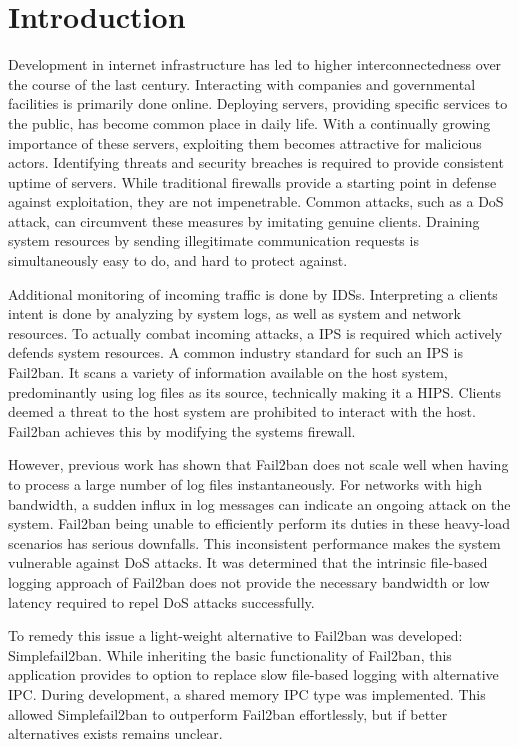 %
%

\chapter{Introduction}
\label{cha:introduction}
Development in internet infrastructure has led to higher interconnectedness over the course of the last century.
Interacting with companies and governmental facilities is primarily done online.
Deploying servers, providing specific services to the public, has become common place in daily life.
With a continually growing importance of these servers, exploiting them becomes attractive for malicious actors.
Identifying threats and security breaches is required to provide consistent uptime of servers.
While traditional firewalls provide a starting point in defense against exploitation, they are not impenetrable.
Common attacks, such as a \ac{DoS} attack, can circumvent these measures by imitating genuine clients.
Draining system resources by sending illegitimate communication requests is simultaneously easy to do, and hard to protect against.

Additional monitoring of incoming traffic is done by \ac{IDSs}.
Interpreting a clients intent is done by analyzing by system logs, as well as system and network resources.
To actually combat incoming attacks, a \ac{IPS} is required which actively defends system resources.
A common industry standard for such an \ac{IPS} is Fail2ban\cite{git:fail2ban}.
It scans a variety of information available on the host system, predominantly using log files as its source, technically making it a \ac{HIPS}.
Clients deemed a threat to the host system are prohibited to interact with the host.
Fail2ban achieves this by modifying the systems firewall.

However, previous work has shown that Fail2ban does not scale well when having to process a large number of log files instantaneously\cite{mikolajczak:ebpf}.
For networks with high bandwidth, a sudden influx in log messages can indicate an ongoing attack on the system.
Fail2ban being unable to efficiently perform its duties in these heavy-load scenarios has serious downfalls.
This inconsistent performance makes the system vulnerable against \ac{DoS} attacks.
It was determined that the intrinsic file-based logging approach of Fail2ban does not provide the necessary bandwidth or low latency required to repel \ac{DoS} attacks successfully.

To remedy this issue a light-weight alternative to Fail2ban was developed: Simplefail2ban\cite{raatschen:ipc}.
While inheriting the basic functionality of Fail2ban, this application provides to option to replace slow file-based logging with alternative \ac{IPC}.
During development, a shared memory \ac{IPC} type was implemented.
This allowed Simplefail2ban to outperform Fail2ban effortlessly\cite{raatschen:ipc}, but if better alternatives exists remains unclear.

